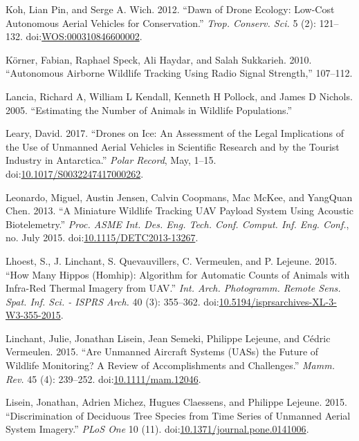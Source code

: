 \documentclass[]{interact}
\theoremstyle{plain}%
\theoremstyle{definition}
\theoremstyle{remark}
\begin{document}
\hypertarget{ref-koh_dawn_2012}{}
Koh, Lian Pin, and Serge A. Wich. 2012. ``Dawn of Drone Ecology:
Low-Cost Autonomous Aerial Vehicles for Conservation.'' \emph{Trop.
Conserv. Sci.} 5 (2): 121--132.
doi:\href{https://doi.org/WOS:000310846600002}{WOS:000310846600002}.

\hypertarget{ref-korner_autonomous_2010}{}
Körner, Fabian, Raphael Speck, Ali Haydar, and Salah Sukkarieh. 2010.
``Autonomous Airborne Wildlife Tracking Using Radio Signal Strength,''
107--112.

\hypertarget{ref-lancia_estimating_2005}{}
Lancia, Richard A, William L Kendall, Kenneth H Pollock, and James D
Nichols. 2005. ``Estimating the Number of Animals in Wildlife
Populations.''

\hypertarget{ref-leary_drones_2017}{}
Leary, David. 2017. ``Drones on Ice: An Assessment of the Legal
Implications of the Use of Unmanned Aerial Vehicles in Scientific
Research and by the Tourist Industry in Antarctica.'' \emph{Polar
Record}, May, 1--15.
doi:\href{https://doi.org/10.1017/S0032247417000262}{10.1017/S0032247417000262}.

\hypertarget{ref-leonardo_miniature_2013}{}
Leonardo, Miguel, Austin Jensen, Calvin Coopmans, Mac McKee, and
YangQuan Chen. 2013. ``A Miniature Wildlife Tracking UAV Payload System
Using Acoustic Biotelemetry.'' \emph{Proc. ASME Int. Des. Eng. Tech.
Conf. Comput. Inf. Eng. Conf.}, no. July 2015.
doi:\href{https://doi.org/10.1115/DETC2013-13267}{10.1115/DETC2013-13267}.

\hypertarget{ref-lhoest_how_2015}{}
Lhoest, S., J. Linchant, S. Quevauvillers, C. Vermeulen, and P. Lejeune.
2015. ``How Many Hippos (Homhip): Algorithm for Automatic Counts of
Animals with Infra-Red Thermal Imagery from UAV.'' \emph{Int. Arch.
Photogramm. Remote Sens. Spat. Inf. Sci. - ISPRS Arch.} 40 (3):
355--362.
doi:\href{https://doi.org/10.5194/isprsarchives-XL-3-W3-355-2015}{10.5194/isprsarchives-XL-3-W3-355-2015}.

\hypertarget{ref-linchant_are_2015}{}
Linchant, Julie, Jonathan Lisein, Jean Semeki, Philippe Lejeune, and
Cédric Vermeulen. 2015. ``Are Unmanned Aircraft Systems (UASs) the
Future of Wildlife Monitoring? A Review of Accomplishments and
Challenges.'' \emph{Mamm. Rev.} 45 (4): 239--252.
doi:\href{https://doi.org/10.1111/mam.12046}{10.1111/mam.12046}.

\hypertarget{ref-lisein_discrimination_2015}{}
Lisein, Jonathan, Adrien Michez, Hugues Claessens, and Philippe Lejeune.
2015. ``Discrimination of Deciduous Tree Species from Time Series of
Unmanned Aerial System Imagery.'' \emph{PLoS One} 10 (11).
doi:\href{https://doi.org/10.1371/journal.pone.0141006}{10.1371/journal.pone.0141006}.
\end{document}
